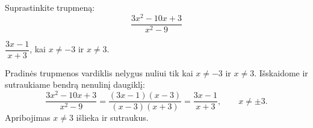 \begin{salyga}
Suprastinkite trupmeną:
    \[ \frac{3x^2 - 10x + 3}{x^2 - 9} \]
\end{salyga}

\begin{atsakymas}
$\dfrac{3x-1}{x+3}$, kai $x\ne-3$ ir $x\ne3$.
\end{atsakymas}

\begin{sprendimas}
Pradinės trupmenos vardiklis nelygus nuliui tik kai $x\ne-3$ ir $x\ne3$. Išskaidome ir sutraukiame bendrą nenulinį daugiklį:
\[
\frac{3x^2-10x+3}{x^2-9}
=\frac{(3x-1)(x-3)}{(x-3)(x+3)}
=\frac{3x-1}{x+3},\qquad x\ne\pm3.
\]
Apribojimas $x\ne3$ išlieka ir sutraukus.
\end{sprendimas}
